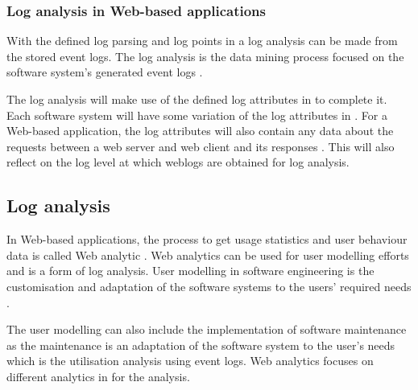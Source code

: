 \subsubsection{Log analysis in Web-based applications}
With the defined log parsing and log points in  a log analysis can be made from the stored event logs. The log analysis is the data mining process focused on the software system's generated event logs \cite{Slaninova2014,Hasiloglu2018}.\par The log analysis will make use of the defined log attributes in  to complete it. Each software system will have some variation of the log attributes in . For a Web-based application, the log attributes will also contain any data about the requests between a web server and web client and its responses \cite{Slaninova2014, Dhanalakshmi2016}. This will also reflect on the log level at which weblogs are obtained for log analysis.


\subsection{Log analysis}\label{sec:ch1_systemUtilisation}
In Web-based applications, the process to get usage statistics and user behaviour data is called Web analytic \cite{Kocsis2012}. Web analytics can be used for user modelling efforts and is a form of log analysis. User modelling in software engineering is the customisation and adaptation of the software systems to the users' required needs \cite{Waqar2017, Paliouras1999}.\par The user modelling can also include the implementation of software maintenance as the maintenance is an adaptation of the software system to the user's needs which is the utilisation analysis using event logs. Web analytics focuses on different analytics in  for the analysis. 

